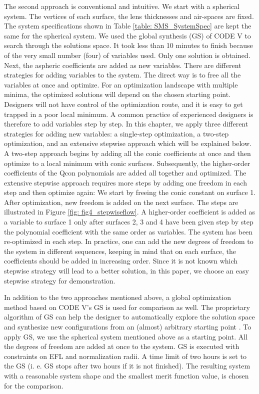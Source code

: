 The second approach is conventional and intuitive. We start with a spherical system. The vertices of each surface, the lens thicknesses and air-spaces are fixed. The system specifications shown in Table \ref{table: SMS_SystemSpec} are kept the same for the spherical system. We used the global synthesis (GS) of CODE V to search through the solutions space. It took less than 10 minutes to finish because of the very small number (four) of variables used. Only one solution is obtained. Next, the aspheric coefficients are added as new variables. There are different strategies for adding variables to the system. The direct way is to free all the variables at once and optimize. For an optimization landscape with multiple minima, the optimized solutions will depend on the chosen starting point. Designers will not have control of the optimization route, and it is easy to get trapped in a poor local minimum. A common practice of experienced designers is therefore to add variables step by step. In this chapter, we apply three different strategies for adding new variables: a single-step optimization, a two-step optimization, and an extensive stepwise approach which will be explained below. A two-step approach begins by adding all the conic coefficients at once and then optimize to a local minimum with conic surfaces. Subsequently, the higher-order coefficients of the Qcon polynomials are added all together and optimized. The extensive stepwise approach requires more steps by adding one freedom in each step and then optimize again: We start by freeing the conic constant on surface 1. After optimization, new freedom is added on the next surface. The steps are illustrated in Figure \ref{fig: fig4_stepwiseflow}. A higher-order coefficient is added as a variable to surface 1 only after surfaces 2, 3 and 4 have been given step by step the polynomial coefficient with the same order as variables. The system has been re-optimized in each step. In practice, one can add the new degrees of freedom to the system in different sequences, keeping in mind that on each surface, the coefficients should be added in increasing order. Since it is not known which stepwise strategy will lead to a better solution, in this paper, we choose an easy stepwise strategy for demonstration.  

In addition to the two approaches mentioned above, a global optimization method based on CODE V’s GS is used for comparison as well. The proprietary algorithm of GS can help the designer to automatically explore the solution space and synthesize new configurations from an (almost) arbitrary starting point \cite{codevmanual}. To apply GS, we use the spherical system mentioned above as a starting point. All the degrees of freedom are added at once to the system. GS is executed with constraints on EFL and normalization radii. A time limit of two hours is set to the GS (i. e. GS stops after two hours if it is not finished). The resulting system with a reasonable system shape and the smallest merit function value, is chosen for the comparison. 

